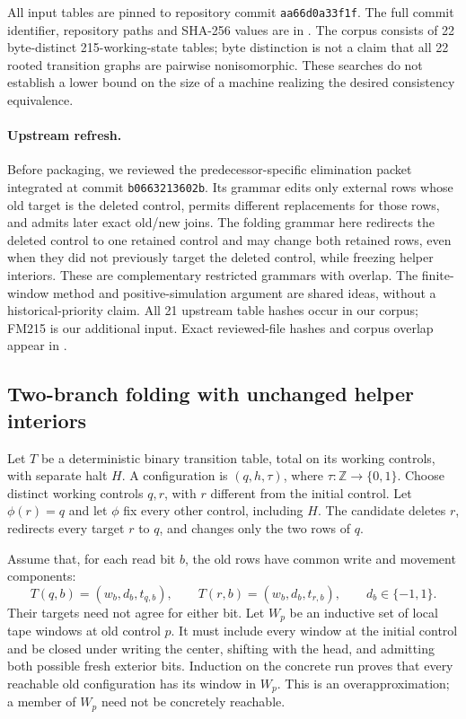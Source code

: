 All input tables are pinned to repository commit \texttt{aa66d0a33f1f}. The full commit identifier, repository paths and SHA-256 values are in . The corpus consists of 22 byte-distinct 215-working-state tables; byte distinction is not a claim that all 22 rooted transition graphs are pairwise nonisomorphic. These searches do not establish a lower bound on the size of a machine realizing the desired consistency equivalence.


\paragraph{Upstream refresh.}
Before packaging, we reviewed the predecessor-specific elimination packet integrated at commit \texttt{b0663213602b}. Its grammar edits only external rows whose old target is the deleted control, permits different replacements for those rows, and admits later exact old/new joins. The folding grammar here redirects the deleted control to one retained control and may change both retained rows, even when they did not previously target the deleted control, while freezing helper interiors. These are complementary restricted grammars with overlap. The finite-window method and positive-simulation argument are shared ideas, without a historical-priority claim. All 21 upstream table hashes occur in our corpus; FM215 is our additional input. Exact reviewed-file hashes and corpus overlap appear in .

\subsection{Two-branch folding with unchanged helper interiors}

Let $T$ be a deterministic binary transition table, total on its working controls, with separate halt $H$. A configuration is $(q,h,\tau)$, where $\tau:\mathbb Z\to\{0,1\}$. Choose distinct working controls $q,r$, with $r$ different from the initial control. Let $\phi(r)=q$ and let $\phi$ fix every other control, including $H$. The candidate deletes $r$, redirects every target $r$ to $q$, and changes only the two rows of $q$.

Assume that, for each read bit $b$, the old rows have common write and movement components:
\[
 T(q,b)=(w_b,d_b,t_{q,b}),\qquad
 T(r,b)=(w_b,d_b,t_{r,b}),\qquad d_b\in\{-1,1\}.
\]
Their targets need not agree for either bit. Let $W_p$ be an inductive set of local tape windows at old control $p$. It must include every window at the initial control and be closed under writing the center, shifting with the head, and admitting both possible fresh exterior bits. Induction on the concrete run proves that every reachable old configuration has its window in $W_p$. This is an overapproximation; a member of $W_p$ need not be concretely reachable.

